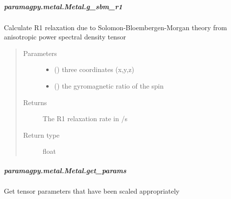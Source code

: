 \documentclass[a4paper,10pt,english,openany,oneside]{sphinxmanual}
\begin{document}
\begin{fulllineitems}
\begin{fulllineitems}
\subparagraph{paramagpy.metal.Metal.g\_sbm\_r1}
\label{\detokenize{reference/generated/paramagpy.metal.Metal.g_sbm_r1:paramagpy-metal-metal-g-sbm-r1}}\label{\detokenize{reference/generated/paramagpy.metal.Metal.g_sbm_r1::doc}}

\begin{fulllineitems}
\label{\detokenize{reference/generated/paramagpy.metal.Metal.g_sbm_r1:paramagpy.metal.Metal.g_sbm_r1}}
Calculate R1 relaxation due to Solomon-Bloembergen-Morgan theory
from anisotropic power spectral density tensor
\begin{quote}\begin{description}
\item[{Parameters}] \leavevmode\begin{itemize}
\item {} 
 () \textendash{} three coordinates (x,y,z)

\item {} 
 () \textendash{} the gyromagnetic ratio of the spin

\end{itemize}

\item[{Returns}] \leavevmode
{} \textendash{} The R1 relaxation rate in /s

\item[{Return type}] \leavevmode
float

\end{description}\end{quote}

\end{fulllineitems}



\subparagraph{paramagpy.metal.Metal.get\_params}
\label{\detokenize{reference/generated/paramagpy.metal.Metal.get_params:paramagpy-metal-metal-get-params}}\label{\detokenize{reference/generated/paramagpy.metal.Metal.get_params::doc}}

\begin{fulllineitems}
\label{\detokenize{reference/generated/paramagpy.metal.Metal.get_params:paramagpy.metal.Metal.get_params}}
Get tensor parameters that have been scaled appropriately


\end{fulllineitems}
\end{fulllineitems}
\end{fulllineitems}
\end{document}
